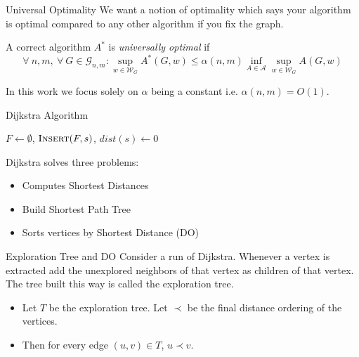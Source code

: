 \documentclass[10pt]{beamer}
\begin{document}
\begin{frame}{Universal Optimality}
	We want a notion of optimality which says your algorithm is optimal compared to any other algorithm if you fix the graph.\pause  \setlength{\parindent}{1cm}\vfill

	A correct algorithm $A^*$ is \emph{universally optimal} if$$\forall\ n,m,\ \forall\ G\in \mathcal{G}_{n,m}: \sup\limits_{w\in \mathcal{W}_G} A^*(G,w)\leq \alpha(n,m)\inf\limits_{A\in \mathcal{A}}\sup\limits_{w\in \mathcal{W}_G} A(G,w)$$\pause \vfill

	In this work we focus solely on $\alpha$ being a constant i.e. $\alpha(n,m)=O(1)$.
\end{frame}
\begin{frame}{Dijkstra Algorithm}
	\begin{algorithm}[H]
		\DontPrintSemicolon
		$F\longleftarrow \emptyset$, $\textsc{Insert}(F,s)$, 	$dist(s)\longleftarrow 0$\;
		\caption{\textsc{Dijkstra}$(G,s,w)$}
	\end{algorithm}\pause
	Dijkstra solves three problems:
	\begin{itemize}
		\item  Computes Shortest Distances\pause
		\item  Build Shortest Path Tree\pause
		\item Sorts vertices by Shortest Distance (DO)
	\end{itemize}
\end{frame}
\begin{frame}{Exploration Tree and DO}
	Consider a run of Dijkstra. Whenever a vertex is extracted add the unexplored neighbors of that vertex as children of that vertex. The tree built this way is called the exploration tree.\pause \setlength{\parindent}{1cm}\vfill

	\begin{itemize}
		\item Let $T$ be the exploration tree. Let $\prec$ be the final distance ordering of the vertices.\pause \vfill
		\item Then for every edge $(u,v)\in T$, $u\prec v$.
	\end{itemize}
\end{frame}
\end{document}
